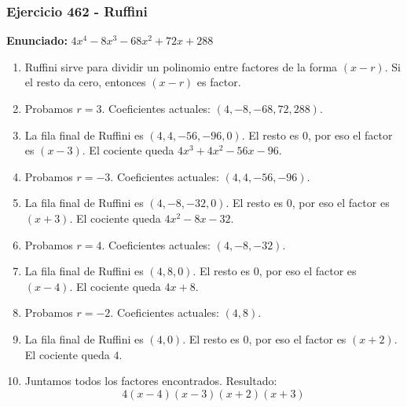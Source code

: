 \documentclass[11pt,a4paper]{article}
\begin{document}
\subsubsection*{Ejercicio 462 - Ruffini}
\textbf{Enunciado:} $ 4 x^{4} - 8 x^{3} - 68 x^{2} + 72 x + 288 $\par
\begin{enumerate}[leftmargin=2em]
\item Ruffini sirve para dividir un polinomio entre factores de la forma \((x-r)\). Si el resto da cero, entonces \((x-r)\) es factor.
\item Probamos \(r=3\). Coeficientes actuales: \((4, -8, -68, 72, 288)\).
\item La fila final de Ruffini es \((4, 4, -56, -96, 0)\). El resto es \(0\), por eso el factor es \((x-3)\). El cociente queda \(4 x^{3} + 4 x^{2} - 56 x - 96\).
\item Probamos \(r=-3\). Coeficientes actuales: \((4, 4, -56, -96)\).
\item La fila final de Ruffini es \((4, -8, -32, 0)\). El resto es \(0\), por eso el factor es \((x+3)\). El cociente queda \(4 x^{2} - 8 x - 32\).
\item Probamos \(r=4\). Coeficientes actuales: \((4, -8, -32)\).
\item La fila final de Ruffini es \((4, 8, 0)\). El resto es \(0\), por eso el factor es \((x-4)\). El cociente queda \(4 x + 8\).
\item Probamos \(r=-2\). Coeficientes actuales: \((4, 8)\).
\item La fila final de Ruffini es \((4, 0)\). El resto es \(0\), por eso el factor es \((x+2)\). El cociente queda \(4\).
\item Juntamos todos los factores encontrados. Resultado: \[\boxed{4 \left(x - 4\right) \left(x - 3\right) \left(x + 2\right) \left(x + 3\right)}\]
\end{enumerate}

\vspace{0.2cm}
\end{document}
